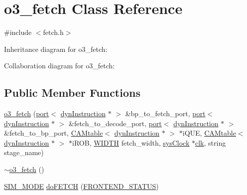 \hypertarget{classo3__fetch}{
\section{o3\_\-fetch Class Reference}
\label{classo3__fetch}
}


{\ttfamily \#include $<$fetch.h$>$}



Inheritance diagram for o3\_\-fetch:


Collaboration diagram for o3\_\-fetch:
\subsection*{Public Member Functions}
\begin{DoxyCompactItemize}
\item 
\hyperlink{classo3__fetch_a713761200dad2eb94986cb1ae90de6bf}{o3\_\-fetch} (\hyperlink{classport}{port}$<$ \hyperlink{classdynInstruction}{dynInstruction} $\ast$ $>$ \&bp\_\-to\_\-fetch\_\-port, \hyperlink{classport}{port}$<$ \hyperlink{classdynInstruction}{dynInstruction} $\ast$ $>$ \&fetch\_\-to\_\-decode\_\-port, \hyperlink{classport}{port}$<$ \hyperlink{classdynInstruction}{dynInstruction} $\ast$ $>$ \&fetch\_\-to\_\-bp\_\-port, \hyperlink{classCAMtable}{CAMtable}$<$ \hyperlink{classdynInstruction}{dynInstruction} $\ast$ $>$ $\ast$iQUE, \hyperlink{classCAMtable}{CAMtable}$<$ \hyperlink{classdynInstruction}{dynInstruction} $\ast$ $>$ $\ast$iROB, \hyperlink{global_2global_8h_a6fa2e24b8a418fa215e183264cbea3aa}{WIDTH} fetch\_\-width, \hyperlink{classsysClock}{sysClock} $\ast$\hyperlink{g__objs_8h_afc4784c140eed1743728e83840e91c12}{clk}, string stage\_\-name)
\item 
\hyperlink{classo3__fetch_ab7a66f1ecf6c3a82af1d7f0a4dc6a819}{$\sim$o3\_\-fetch} ()
\item 
\hyperlink{stage_8h_ac68af0001af4b7049b2435ded74c4e5e}{SIM\_\-MODE} \hyperlink{classo3__fetch_a3ce8bb4391ab7aa8e8c73e389e8a6493}{doFETCH} (\hyperlink{global_2global_8h_afd483fa40f0fa2b1ac067845b91f0c6e}{FRONTEND\_\-STATUS})
\end{DoxyCompactItemize}


